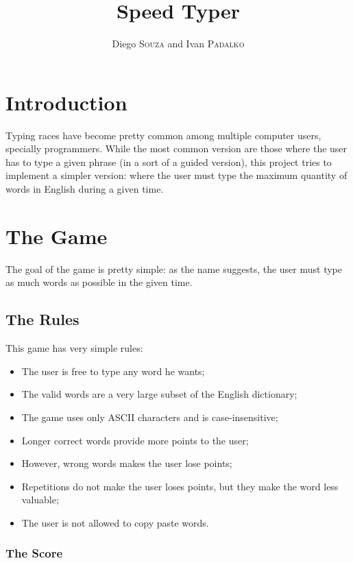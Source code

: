 \documentclass[a4paper,12pt,twoside]{article}
\title{Speed Typer}
\author{Diego \textsc{Souza} and Ivan \textsc{Padalko}}
\date{}
\begin{document}
	\maketitle
	
	\tableofcontents
	\newpage
	
	\section{Introduction}
		
		Typing races have become pretty common among multiple computer users, specially programmers. While the most common version are those where the user has to type a given phrase (in a sort of a guided version), this project tries to implement a simpler version: where the user must type the maximum quantity of words in English during a given time.
		
	\section{The Game}
	
		The goal of the game is pretty simple: as the name suggests, the user must type as much words as possible in the given time.
	
		\subsection{The Rules}
	 
			This game has very simple rules:
			
			\begin{itemize}
				\item The user is free to type any word he wants;
				\item The valid words are a very large subset of the English dictionary;
				\item The game uses only ASCII characters and is case-insensitive;
				\item Longer correct words provide more points to the user;
				\item However, wrong words makes the user lose points;
				\item Repetitions do not make the user loses points, but they make the word less valuable;
				\item The user is not allowed to copy paste words.
			\end{itemize}
	
			\subsubsection{The Score}
	
\end{document}

